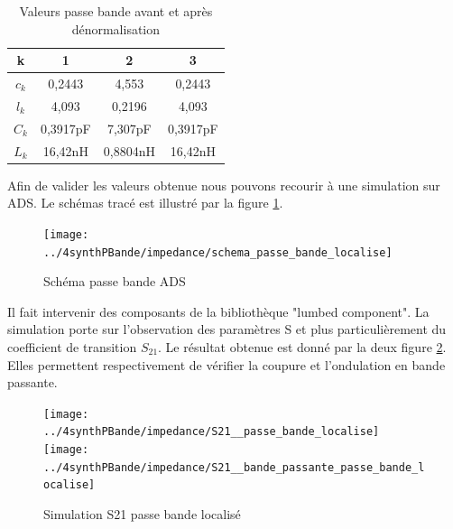 \documentclass[french]{article}
\begin{document}
\begin{table}[H]
	\centering
	\begin{tabular}{|c|c|c|c|}
		\hline
		k & 1 & 2 & 3 \\
		\hline
		$c_k$ & 0,2443 & 4,553 & 0,2443 \\ \hline
		$l_k$ &	4,093	&	0,2196	&	4,093	\\ \hline
		$C_k$ &	0,3917pF&	7,307pF	&	0,3917pF\\ \hline
		$L_k$ &	16,42nH	&	0,8804nH& 16,42nH	\\ \hline
	\end{tabular}
	\caption{Valeurs passe bande avant et après dénormalisation}
	\label{tab:denorm_BP}
\end{table}
Afin de valider les valeurs obtenue nous pouvons recourir à une simulation sur ADS. Le schémas tracé est illustré par la figure \ref{fig:ads_sch_BP_localise}.
\begin{figure}[H]
	\centering
	\texttt{[image: ../4synthPBande/impedance/schema\_passe\_bande\_localise]}
	\caption{Schéma passe bande ADS}
	\label{fig:ads_sch_BP_localise}
\end{figure}
Il fait intervenir des composants de la bibliothèque "lumbed component". La simulation porte sur l'observation des paramètres S et plus particulièrement du coefficient de transition $S_{21}$. Le résultat obtenue est donné par la deux figure \ref{fig:ads_S21_BP_localise1}. Elles permettent respectivement de vérifier la coupure et l'ondulation en bande passante.
\begin{figure}[H]
	\centering
	\texttt{[image: ../4synthPBande/impedance/S21\_\_passe\_bande\_localise]}
	\texttt{[image: ../4synthPBande/impedance/S21\_\_bande\_passante\_passe\_bande\_localise]}
	\caption{Simulation S21 passe bande localisé}
	\label{fig:ads_S21_BP_localise1}
\end{figure}
\end{document}
